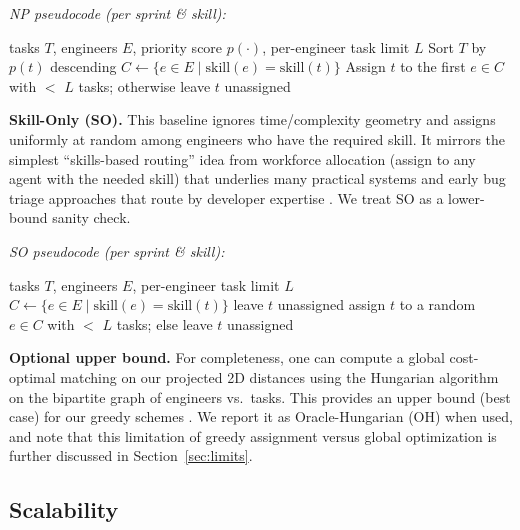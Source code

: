 \documentclass[final,1p,times]{elsarticle}
\begin{document}
\noindent\emph{NP pseudocode (per sprint \& skill):}
\begin{algorithm}[H]
\caption{Naive-Priority baseline}
\label{alg:np}
\begin{algorithmic}[1]
\Require tasks $T$, engineers $E$, priority score $p(\cdot)$, per-engineer task limit $L$
\State Sort $T$ by $p(t)$ descending
  \State $C \gets \{e \in E \mid \text{skill}(e)=\text{skill}(t)\}$
  \State Assign $t$ to the first $e \in C$ with $<$ $L$ tasks; otherwise leave $t$ unassigned
\EndFor
\end{algorithmic}
\end{algorithm}

\noindent\textbf{Skill-Only (SO).} This baseline ignores time/complexity geometry and assigns uniformly at random among engineers who have the required skill. It mirrors the simplest “skills-based routing” idea from workforce allocation (assign to any agent with the needed skill) that underlies many practical systems and early bug triage approaches that route by developer expertise \cite{xuan2017bugtriage,guo2011notmybug}. We treat SO as a lower-bound sanity check.
\vspace{2pt}

\noindent\emph{SO pseudocode (per sprint \& skill):}
\begin{algorithm}[H]
\caption{Skill-Only baseline}
\label{alg:so}
\begin{algorithmic}[1]
\Require tasks $T$, engineers $E$, per-engineer task limit $L$
  \State $C \gets \{e \in E \mid \text{skill}(e)=\text{skill}(t)\}$
   leave $t$ unassigned
  \Else assign $t$ to a random $e \in C$ with $<$ $L$ tasks; else leave $t$ unassigned
  \EndIf
\EndFor
\end{algorithmic}
\end{algorithm}

\noindent\textbf{Optional upper bound.} 
For completeness, one can compute a global cost-optimal matching on our projected 2D distances using the Hungarian algorithm on the bipartite graph of engineers vs.\ tasks. 
This provides an upper bound (best case) for our greedy schemes \cite{kuhn1955hungarian,munkres1957algorithms,BurkardAssignmentBook}. 
We report it as Oracle-Hungarian (OH) when used, and note that this limitation of greedy assignment versus global optimization is further discussed in Section~\ref{sec:limits}.

\subsection{Scalability}
\label{sec:scalability}
\end{document}
